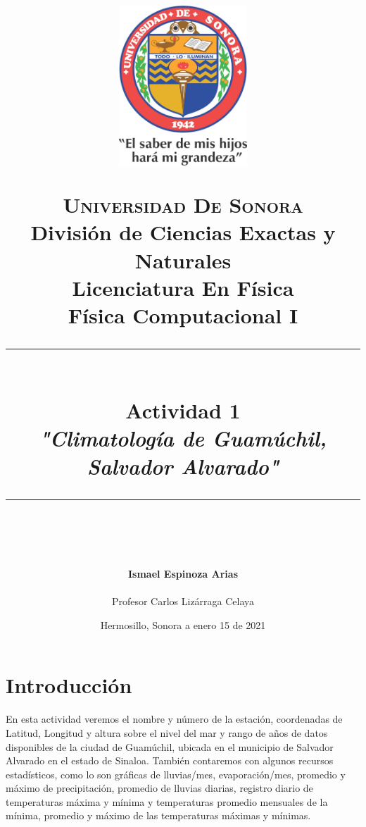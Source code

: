 \documentclass[12pt]{article}
\newcommand{\HRule}[1]{\rule{\linewidth}{#1}}
\begin{document}
\begin{titlepage}

\title{ \normalsize 
        \begin{center}
        \includegraphics[height=6cm]{Logo.jpg}
        \end{center}
        \LARGE \textsc{\textbf{Universidad De Sonora}} \\ \bigskip
		\Large División de Ciencias Exactas y Naturales \\
        Licenciatura En Física \\ \bigskip
        \bigskip
        Física Computacional I
		\\ [0.1cm]  
		\HRule{2pt} \\
		\Large \textbf{{Actividad 1}} \\
        \textit{\textbf{"Climatología de Guamúchil, Salvador Alvarado"}}
		\HRule{2pt} \\
		\normalsize \vspace*{0.001\baselineskip}}
        
\date{\bigskip \Large  \hspace*{\fill} Hermosillo, Sonora a enero 15 de 2021}

        
\author{
		\Large\textbf{ Ismael Espinoza Arias} \\ \bigskip
        \\ \bigskip
       \Large Profesor Carlos Lizárraga Celaya}
       \end{titlepage}
       \maketitle
       

\newpage
\pagestyle{plain}
\section{Introducción}
 En esta actividad veremos el nombre y número de la estación, coordenadas de Latitud, Longitud y altura sobre el nivel del mar y rango de años de datos disponibles de la ciudad de Guamúchil, ubicada en el municipio de Salvador Alvarado en el estado de Sinaloa. También contaremos con algunos recursos estadísticos, como lo son gráficas de lluvias/mes, evaporación/mes, promedio y máximo de precipitación, promedio de lluvias diarias, registro diario de temperaturas máxima y mínima y temperaturas promedio mensuales de la mínima, promedio y máximo de las temperaturas máximas y mínimas.
\end{document}
